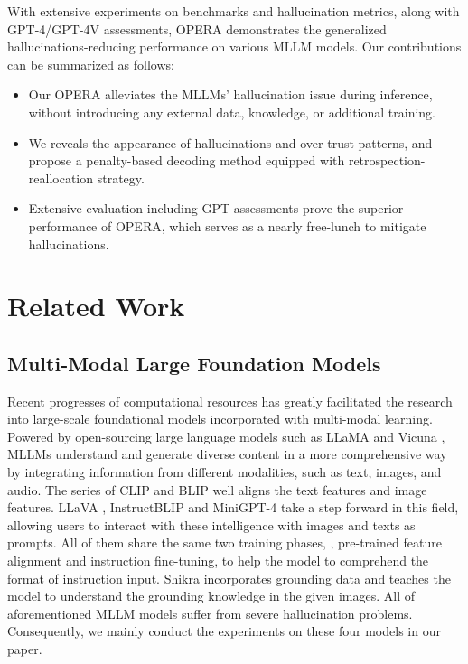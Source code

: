 \documentclass[10pt,twocolumn,letterpaper]{article}
\begin{document}
With extensive experiments on benchmarks and hallucination metrics, along with GPT-4/GPT-4V assessments, OPERA demonstrates the generalized hallucinations-reducing performance on various MLLM models. 
Our contributions can be summarized as follows:
\begin{itemize}
    \item Our OPERA alleviates the MLLMs' hallucination issue during inference, without introducing any external data, knowledge, or additional training.
    \item We reveals the appearance of hallucinations and over-trust patterns, and propose a penalty-based decoding method equipped with retrospection-reallocation strategy. 
    \item Extensive evaluation including GPT assessments prove the superior performance of OPERA, which serves as a nearly free-lunch to mitigate hallucinations.
\end{itemize}






\section{Related Work}
\label{sec:related_work}

\subsection{Multi-Modal Large Foundation Models}

Recent progresses of computational resources has greatly facilitated the research into large-scale foundational models incorporated with multi-modal learning. 
Powered by open-sourcing large language models such as LLaMA \cite{touvron2023llama,touvron2023llama2} and Vicuna \cite{chiang2023vicuna}, 
MLLMs \cite{liu2023llava,zhu2023minigpt,instructblip,huang2021initiative,bai2023qwen,huang2023diversity,huang2022shape,chen2023sharegpt4v} understand and generate diverse content in a more comprehensive way by integrating information from different modalities, such as text, images, and audio. 
The series of CLIP and BLIP well aligns the text features and image features. 
LLaVA \cite{liu2023llava}, InstructBLIP \cite{instructblip} and MiniGPT-4 \cite{zhu2023minigpt} take a step forward in this field, allowing users to interact with these intelligence with images and texts as prompts. 
All of them share the same two training phases, \ie, pre-trained feature alignment and instruction fine-tuning, to help the model to comprehend the format of instruction input. 
Shikra \cite{chen2023shikra} incorporates grounding data and teaches the model to understand the grounding knowledge in the given images. 
All of aforementioned MLLM models suffer from severe hallucination problems. 
Consequently, we mainly conduct the experiments on these four models in our paper. 
\end{document}
